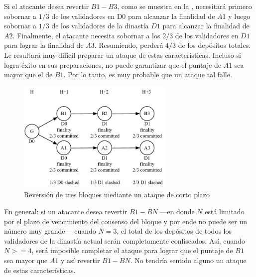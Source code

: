 Si el atacante desea revertir $B1-B3$, como se muestra en la , necesitará primero sobornar a $1/3$ de los validadores en D0 para alcanzar la finalidad de $A1$ y luego sobornar a $1/3$ de los validadores de la dinastía $D1$ para alcanzar la finalidad de $A2$. Finalmente, el atacante necesita sobornar a los $2/3$ de los validadores en $D1$ para lograr la finalidad de $A3$. Resumiendo, perderá $4/3$ de los depósitos totales. Le resultará muy difícil preparar un ataque de estas características. Incluso si logra éxito en sus preparaciones, no puede garantizar que el puntaje de $A1$ sea mayor que el de $B1$. Por lo tanto, es muy probable que un ataque tal falle.

\begin{figure}[h]
\centering
\includegraphics[width=7.5cm]{./figs/revert3}
\caption{Reversión de tres bloques mediante un ataque de corto plazo}
\label{fig:revert3}
\end{figure}

En general: si un atacante desea revertir $B1-BN$ —en donde $N$ está limitado por el plazo de vencimiento del consenso del bloque y por ende no puede ser un número muy grande— cuando $N = 3$, el total de los depósitos de todos los validadores de la dinastía actual serán completamente confiscados. Así, cuando $N >= 4$, será imposible completar el ataque para lograr que el puntaje de $B1$ sea mayor que $A1$ y así revertir $B1-BN$. No tendría sentido alguno un ataque de estas características.